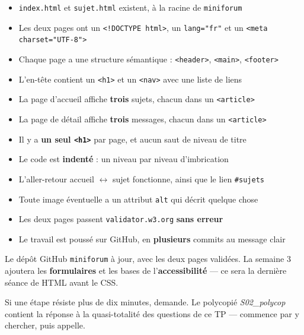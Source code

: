 \documentclass[a4paper,11pt]{article}
\begin{document}
\begin{tcolorbox}[definition, title={Auto-évaluation}]
\begin{itemize}
  \item[$\square$] \texttt{index.html} et \texttt{sujet.html} existent, à la racine de \texttt{miniforum}
  \item[$\square$] Les deux pages ont un \texttt{<!DOCTYPE html>}, un \texttt{lang="fr"} et un \texttt{<meta charset="UTF-8">}
  \item[$\square$] Chaque page a une structure sémantique : \texttt{<header>}, \texttt{<main>}, \texttt{<footer>}
  \item[$\square$] L'en-tête contient un \texttt{<h1>} et un \texttt{<nav>} avec une liste de liens
  \item[$\square$] La page d'accueil affiche \textbf{trois} sujets, chacun dans un \texttt{<article>}
  \item[$\square$] La page de détail affiche \textbf{trois} messages, chacun dans un \texttt{<article>}
  \item[$\square$] Il y a \textbf{un seul \texttt{<h1>}} par page, et aucun saut de niveau de titre
  \item[$\square$] Le code est \textbf{indenté} : un niveau par niveau d'imbrication
  \item[$\square$] L'aller-retour accueil $\leftrightarrow$ sujet fonctionne, ainsi que le lien \texttt{\#sujets}
  \item[$\square$] Toute image éventuelle a un attribut \texttt{alt} qui décrit quelque chose
  \item[$\square$] Les deux pages passent \texttt{validator.w3.org} \textbf{sans erreur}
  \item[$\square$] Le travail est poussé sur GitHub, en \textbf{plusieurs} commits au message clair
\end{itemize}
\end{tcolorbox}

\vspace{6pt}
\begin{tcolorbox}[attention, title={À rendre avant la semaine 3}]
Le dépôt GitHub \texttt{miniforum} à jour, avec les deux pages validées. La semaine 3 ajoutera les \textbf{formulaires} et les bases de l'\textbf{accessibilité} --- ce sera la dernière séance de HTML avant le CSS.
\end{tcolorbox}

\vspace{6pt}
\begin{tcolorbox}[astuce, title={Bloqué ?}]
Si une étape résiste plus de dix minutes, demande. Le polycopié \textit{S02\_polycop} contient la réponse à la quasi-totalité des questions de ce TP --- commence par y chercher, puis appelle.
\end{tcolorbox}
\end{document}
